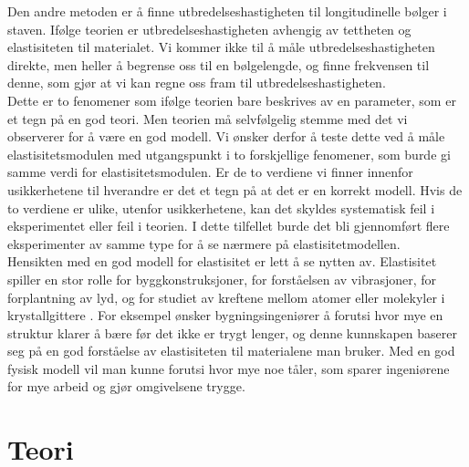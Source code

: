 \documentclass[%
 reprint,
 amsmath,amssymb,
 aps,
 norsk,
 booktabs
]{revtex4-1}
\begin{document}
Den andre metoden er å finne utbredelseshastigheten til longitudinelle bølger i staven. Ifølge teorien er utbredelseshastigheten avhengig av tettheten og elastisiteten til materialet. Vi kommer ikke til å måle utbredelseshastigheten direkte, men heller å begrense oss til en bølgelengde, og finne frekvensen til denne, som gjør at vi kan regne oss fram til utbredelseshastigheten.\\
Dette er to fenomener som ifølge teorien bare beskrives av en parameter, som er et tegn på en god teori. Men teorien må selvfølgelig stemme med det vi observerer for å være en god modell. Vi ønsker derfor å teste dette ved å måle elastisitetsmodulen med utgangspunkt i to forskjellige fenomener, som burde gi samme verdi for elastisitetsmodulen. Er de to verdiene vi finner innenfor usikkerhetene til hverandre er det et tegn på at det er en korrekt modell. Hvis de to verdiene er ulike, utenfor usikkerhetene, kan det skyldes systematisk feil i eksperimentet eller feil i teorien. I dette tilfellet burde det bli gjennomført flere eksperimenter av samme type for å se nærmere på elastisitetmodellen.\\
Hensikten med en god modell for elastisitet er lett å se nytten av. Elastisitet spiller en stor rolle for byggkonstruksjoner, for forståelsen av vibrasjoner, for forplantning av lyd, og for studiet av kreftene mellom atomer eller molekyler i krystallgittere \cite{gronn}. For eksempel ønsker bygningsingeniører å forutsi hvor mye en struktur klarer å bære før det ikke er trygt lenger, og denne kunnskapen baserer seg på en god forståelse av elastisiteten til materialene man bruker. Med en god fysisk modell vil man kunne forutsi hvor mye noe tåler, som sparer ingeniørene for mye arbeid og gjør omgivelsene trygge.
\section{Teori}
\end{document}
